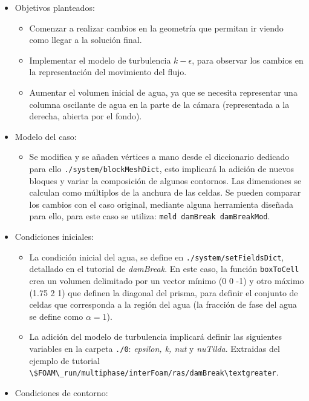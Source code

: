 \begin{itemize}
\item
  Objetivos planteados:

  \begin{itemize}
  \item
    Comenzar a realizar cambios en la geometría que permitan ir viendo
    como llegar a la solución final.
  \item
    Implementar el modelo de turbulencia \(k-\epsilon\), para observar
    los cambios en la representación del movimiento del flujo.
  \item
    Aumentar el volumen inicial de agua, ya que se necesita representar
    una columna oscilante de agua en la parte de la cámara (representada
    a la derecha, abierta por el fondo).
  \end{itemize}
\item
  Modelo del caso:

  \begin{itemize}
  \item
    Se modifica y se añaden vértices a mano desde el diccionario
    dedicado para ello \lstinline[style=bash]{./system/blockMeshDict},
    esto implicará la adición de nuevos bloques y variar la composición
    de algunos contornos. Las dimensiones se calculan como múltiplos de
    la anchura de las celdas. Se pueden comparar los cambios con el caso
    original, mediante alguna herramienta diseñada para ello, para este
    caso se utiliza: \lstinline[style=bash]{meld damBreak damBreakMod}.
  \end{itemize}
\item
  Condiciones iniciales:

  \begin{itemize}
  \item
    La condición inicial del agua, se define en
    \lstinline[style=bash]{./system/setFieldsDict}, detallado en el
    tutorial de \emph{damBreak}. En este caso, la función \texttt{boxToCell}
    crea un volumen delimitado por un vector mínimo (0 0 -1) y otro
    máximo (1.75 2 1) que definen la diagonal del prisma, para definir
    el conjunto de celdas que corresponda a la región del agua (la
    fracción de fase del agua se define como \(\alpha=1\)).
  \item
    La adición del modelo de turbulencia implicará definir las
    siguientes variables en la carpeta \lstinline[style=bash]{./0}:
    \emph{epsilon, k, nut} y \emph{nuTilda}. Extraidas del ejemplo de
    tutorial
    \lstinline[style=bash]{\$FOAM\_run/multiphase/interFoam/ras/damBreak\textgreater}.
  \end{itemize}
\item
  Condiciones de contorno:


\end{itemize}
